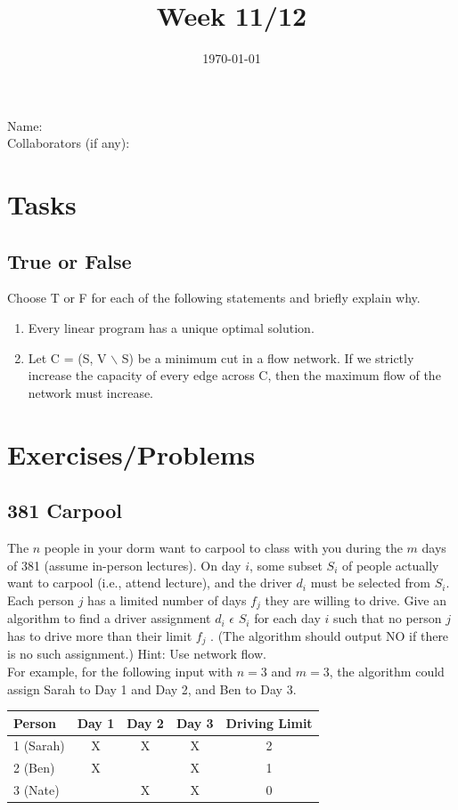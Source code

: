 \documentclass[12pt]{amsart}
\title{Week 11/12}
\date{\today}
\begin{document}
\maketitle


Name: 
\\

Collaborators (if any): 

\section{Tasks}

\subsection{True or False}
Choose T or F for each of the following statements and briefly explain why.  
\begin{enumerate}
\item Every linear program has a unique optimal solution.  
\item Let C = (S, V $\backslash$ S) be a minimum cut in a flow network. If we strictly increase the capacity of every edge across C, then the maximum flow of the network must increase.   
\end{enumerate}

\section{Exercises/Problems}

\subsection{381 Carpool} 
The $n$ people in your dorm want to carpool to class with you during the $m$ days of 381 (assume in-person lectures). On day $i$, some subset $S_i$ of people actually want to carpool (i.e., attend lecture), and the driver $d_i$ must be selected from $S_i$. Each person $j$ has a limited number of days $f_j$ they are willing to drive. Give an algorithm to find a driver assignment $d_i$ $\epsilon$ $S_i$ for each day $i$ such that no person $j$ has to drive more than their limit $f_j$ . (The algorithm should output NO if there is no such assignment.) Hint: Use network flow.\\ 

For example, for the following input with $n = 3$ and $m = 3$, the algorithm could assign Sarah to Day 1 and Day 2, and Ben to Day 3. \\

  \begin{tabular}{ | l | c | c | c | c |}
        \hline
            Person & Day 1 & Day 2 & Day 3 & Driving Limit \\
        \hline
            1 (Sarah) & X & X & X & 2 \\
            2 (Ben) & X & & X & 1 \\
            3 (Nate) &  & X & X & 0 \\
        \hline
        \end{tabular}
\end{document}
